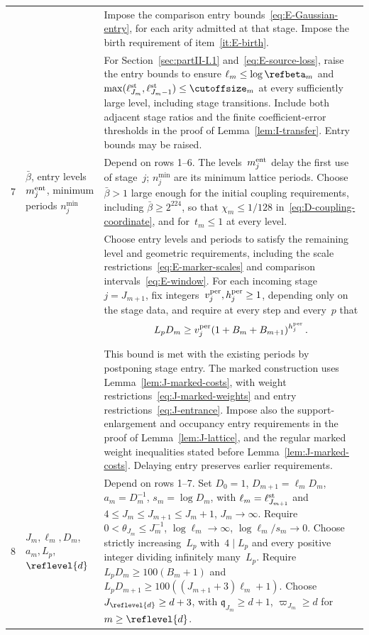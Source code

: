 \begin{longtable}{@{}p{}p{}p{}@{}}
 & & Impose the comparison entry bounds~\eqref{eq:E-Gaussian-entry}, for each arity admitted at that stage. Impose the birth requirement of item~\ref{it:E-birth}.\\[3pt]
 & & For Section~\ref{sec:partII-I.1} and~\eqref{eq:E-source-loss}, raise the entry bounds to ensure $\ell_m\le\log\refbeta_m$ and $\max(\ell^{\rm st}_{J_m},\ell^{\rm st}_{J_m-1})\le\cutoffsize_m$ at every sufficiently large level, including stage transitions. Include both adjacent stage ratios and the finite coefficient-error thresholds in the proof of Lemma~\ref{lem:I-transfer}. Entry bounds may be raised.\\[3pt]
7 & \raggedright $\bar\beta$, entry levels $m_j^{\rm ent}$, minimum periods $n_j^{\min}$ & Depend on rows 1--6. The levels~$m_j^{\rm ent}$ delay the first use of stage~$j$; $n_j^{\min}$ are its minimum lattice periods. Choose~$\bar\beta>1$ large enough for the initial coupling requirements, including $\bar\beta\ge2^{224}$, so that $\chi_m\le1/128$ in~\eqref{eq:D-coupling-coordinate}, and for~$t_m\le1$ at every level.\\[3pt]
 & & Choose entry levels and periods to satisfy the remaining level and geometric requirements, including the scale restrictions~\eqref{eq:E-marker-scales} and comparison intervals~\eqref{eq:E-window}. For each incoming stage~$j=J_{m+1}$, fix integers~$v_j^{\rm per},h_j^{\rm per}\ge1$, depending only on the stage data, and require at every step and every~$p$ that
\begin{equation*}
L_pD_m\ge v_j^{\rm per}(1+B_m+B_{m+1})^{h_j^{\rm per}}\,.
\end{equation*}\\[3pt]
 & & This bound is met with the existing periods by postponing stage entry. The marked construction uses Lemma~\ref{lem:J-marked-costs}, with weight restrictions~\eqref{eq:J-marked-weights} and entry restrictions~\eqref{eq:J-entrance}. Impose also the support-enlargement and occupancy entry requirements in the proof of Lemma~\ref{lem:J-lattice}, and the regular marked weight inequalities stated before Lemma~\ref{lem:J-marked-costs}. Delaying entry preserves earlier requirements.\\[3pt]
8 & \raggedright $J_m,\ell_m,D_m$, $a_m,L_p$, $\reflevel{d}$ & Depend on rows 1--7. Set $D_0=1$, $D_{m+1}=\ell_mD_m$, $a_m=D_m^{-1}$, $s_m=\log D_m$, with $\ell_m=\ell^{\rm st}_{J_{m+1}}$ and $4\le J_m\le J_{m+1}\le J_m+1$, $J_m\to\infty$. Require $0<\theta_{J_m}\le J_m^{-1}$, $\log\ell_m\to\infty$, $\log\ell_m/s_m\to0$. Choose strictly increasing~$L_p$ with~$4\mid L_p$ and every positive integer dividing infinitely many~$L_p$. Require $L_pD_m\ge100(B_m+1)$ and $L_pD_{m+1}\ge100((J_{m+1}+3)\ell_m+1)$. Choose $J_{\reflevel{d}}\ge d+3$, with $\mathfrak q_{J_m}\ge d+1$, $\varpi_{J_m}\ge d$ for $m\ge\reflevel{d}$.\\[3pt]

\end{longtable}
